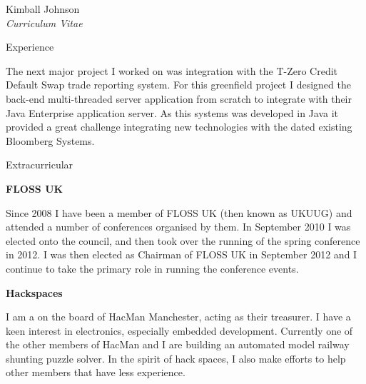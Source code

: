 \documentclass[10pt]{article}
\newenvironment{subbulletlist}{%
	\begin{list}{\labelitemii}{%
		\setlength{\topsep}{\itemsep}\setlength{\parskip}{\parsep}%
	}%
}%
{ \end{list} }
\begin{document}
\begin{cv}{Kimball Johnson\\{\large \itshape Curriculum Vitae}}
\begin{cvlist}{Experience}
\begin{subbulletlist}
    The next major project I worked on was integration with the T-Zero
    Credit Default Swap trade reporting system. For this greenfield project 
	I designed the back-end multi-threaded server application from scratch to integrate 
	with their Java Enterprise application server.  As this systems was developed
	in Java it provided a great challenge integrating new technologies with the dated 
    existing Bloomberg Systems.  
	\end{subbulletlist}


\end{cvlist}

\pagebreak
\begin{cvlist}{Extracurricular}
\item \textbf{FLOSS UK}

Since 2008 I have been a member of FLOSS UK (then known as UKUUG) and attended
a number of conferences organised by them.  In September 2010 I was elected
onto the council, and then took over the running of the spring conference in
2012.  I was then elected as Chairman of FLOSS UK in September 2012 and I 
continue to take the primary role in running the conference events.

\item \textbf{Hackspaces}

I am a on the board of HacMan Manchester, acting as their treasurer. I have a 
keen interest in electronics, especially embedded
development.  Currently one of the other members of HacMan and I are building
an automated model railway shunting puzzle solver. In the spirit of hack
spaces, I also make efforts to help other members that have less experience.

\end{cvlist}
\end{cv}
\end{document}
